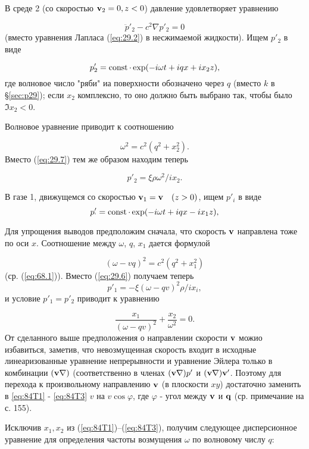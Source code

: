 В среде 2 (со скоростью $\mathbf{v}_2 = 0, z<0$) давление удовлетворяет уравнению

\[
    \ddot p'_2 - c^2 \nabla p'_2 = 0
\]
(вместо уравнения Лапласа (\ref{eq:29.2}) в несжимаемой жидкости). Ищем $p'_2$ в виде

\[
    p'_2 = \mathop{\mathrm{const}}\nolimits \cdot \exp ( -i\omega t + iqx + ix_2z),
\]
где волновое число "ряби" иа поверхности обозначено через $q$ (вместо $k$ в \S \ref{sec:p29}); если $x_2$ комплексно, то оно должно быть выбрано так, чтобы было $\Im x_2 <0$.

Волновое уравнение приводит к соотношению

\begin{equation}
    \label{eq:84T1}
    \omega^2 = c^2 (q^2 + x^2_2).
\end{equation}
Вместо (\ref{eq:29.7}) тем же образом находим теперь

\[
    p'_2 = \xi\rho\omega^2/ix_2.
\]

В газе 1, движущемся со скоростью $\mathbf{v}_1 = \mathbf{v} \quad (z>0)$, ищем $p'_i$ в виде
\[
    p'_` = \mathop{\mathrm{const}}\nolimits \cdot \exp ( -i\omega t + iqx - ix_1z),
\]

Для упрощения выводов предположим сначала, что скорость $\mathbf{v}$ направлена тоже по оси $x$. Соотношение между $\omega$, $q$, $x_1$ дается формулой

\begin{equation}
    \label{eq:84T2}
    (\omega -vq)^2 = c^2(q^2+x^2_1)
\end{equation}
(ср. (\ref{eq:68.1})). Вместо (\ref{eq:29.6}) получаем теперь
\[
    p'_1 = -\xi(\omega-qv)^2\rho/ix_i,
\]
и условие $p'_1 = p'_2$ приводит к уравнению

\begin{equation}
    \label{eq:84T3}
    \frac{x_1}{(\omega - qv)^2} + \frac{x_2}{\omega^2} = 0.
\end{equation}
От сделанного выше предположения о направлении скорости $\mathbf{v}$ можио избавиться, заметив, что невозмущеиная скорость входит в исходные линеаризованные уравнение непрерывности и уравнение Эйлера только в комбинации $(\mathbf{v} \nabla)$ (соответственно в членах $(\mathbf{v}\nabla)p'$ и $(\mathbf{v}\nabla)\mathbf{v}'$.
Поэтому для перехода к произвольному направлению $\mathbf{v}$ (в плоскости $xy$) достаточно заменить в \ref{eq:84T1} - \ref{eq:84T3} $v$ на $v\cos\varphi$, где $\varphi$ - угол между $\mathbf{v}$ и $\mathbf{q}$ (ср. примечание на с. 155).


Исключив $x_1, x_2$ из (\ref{eq:84T1})--(\ref{eq:84T3}), получим следующее дисперсионное уравнение для определения частоты возмущения $\omega$ по волновому числу $q$:

